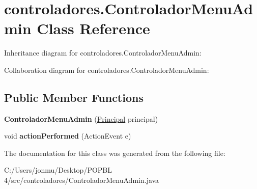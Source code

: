 \hypertarget{classcontroladores_1_1_controlador_menu_admin}{}\section{controladores.\+Controlador\+Menu\+Admin Class Reference}
\label{classcontroladores_1_1_controlador_menu_admin}


Inheritance diagram for controladores.\+Controlador\+Menu\+Admin\+:


Collaboration diagram for controladores.\+Controlador\+Menu\+Admin\+:
\subsection*{Public Member Functions}
\begin{DoxyCompactItemize}
\item 
\mbox{\label{classcontroladores_1_1_controlador_menu_admin_a12c2b360472a2aa24c7ca77751a3880c}} 
{\bfseries Controlador\+Menu\+Admin} (\mbox{\hyperlink{classvistas_1_1_principal}{Principal}} principal)
\item 
\mbox{\label{classcontroladores_1_1_controlador_menu_admin_a82d2cd7e031a45484fdf83e50a82cf1e}} 
void {\bfseries action\+Performed} (Action\+Event e)
\end{DoxyCompactItemize}


The documentation for this class was generated from the following file\+:\begin{DoxyCompactItemize}
\item 
C\+:/\+Users/jonmu/\+Desktop/\+P\+O\+P\+B\+L 4/src/controladores/Controlador\+Menu\+Admin.\+java\end{DoxyCompactItemize}

